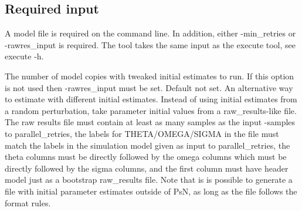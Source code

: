 \subsection{Required input}
A model file is required on the command line. In addition, either -min\_retries or -rawres\_input is required. The tool takes the same input as the execute tool, see execute -h.
\begin{optionlist}
The number of model copies with tweaked initial estimates to run. If this option is not used then -rawres\_input must be set.
\nextopt
{}
Default not set. An alternative way to estimate with different initial estimates. Instead of using initial estimates from a random perturbation, take parameter initial values from a raw\_results-like file. The raw results file must contain at least as many samples as the input -samples to parallel\_retries, the labels for  THETA/OMEGA/SIGMA in the file must match the labels in the simulation model given as input to parallel\_retries, the theta columns must be directly followed by the omega columns which must be directly followed by the sigma columns, and the first column must have header model just as a bootstrap raw\_results file. Note that is is possible to generate a file with initial parameter estimates outside of PsN, as long as the file follows the format rules.
\nextopt
\end{optionlist}

